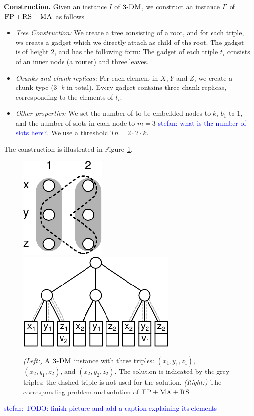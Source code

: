 \documentclass[9pt]{sigcomm-alternate}
\newcommand{\stefan}[1]{\textcolor{blue}{stefan: #1}}
\newcommand{\FP}{\textsc{FP}}
\newcommand{\RS}{\textsc{RS}}
\newcommand{\MA}{\textsc{MA}}
\newcommand{\CostTrans}{\ensuremath{b_1}}
\newcommand{\TDM}{\textsc{3-DM}}
\newcommand{\Thr}{\ensuremath{Th}}
\begin{document}
\textbf{Construction.}
Given an instance $I$ of $\TDM$, we construct an instance $I'$ of
$\FP+\RS+\MA$ as follows:
\begin{itemize}
\item \emph{Tree Construction:} We create a tree consisting of a root,
and for each triple, we create a gadget which we directly attach as
child of the root. The gadget is of height 2,
and has the following form:
The gadget of each triple $t_i$ consists of an inner node (a router) and three leaves.
\item \emph{Chunks and chunk replicas:} For each element in $X$, $Y$ and $Z$,
 we create a chunk type
($3 \cdot k$ in total). Every gadget
contains three chunk replicas, corresponding to the elements of $t_i$.
\item \emph{Other properties:} We set the number of to-be-embedded nodes to $k$,
$\CostTrans$ to $1$, and the number of slots in each node to $m=3$ \stefan{what
is the number of slots here?}. We use a threshold $\Thr=2 \cdot 2 \cdot k$.
\end{itemize}

The construction is illustrated in Figure~\ref{fig:fprsma}.
\begin{figure}[htbp]
\includegraphics[width = 0.3\columnwidth]{figs/np_3dm_formular}
\hfill
\includegraphics[width = 0.6\columnwidth]{figs/np_3dm_construction}
\caption{\textit{(Left:)} A $\TDM$ instance with three triples:
$(x_1, y_1, z_1)$, $(x_2, y_1, z_2)$, and $(x_2, y_2, z_2)$. The solution is
indicated by the grey triples; the dashed triple is not used for the
solution. \textit{(Right:)} The corresponding problem and solution of $\FP + \MA
+ \RS$.}
\label{fig:fprsma}
\end{figure}
\stefan{TODO: finish picture and add a caption explaining its
elements}
\end{document}
